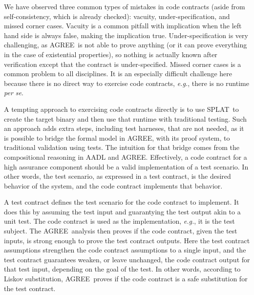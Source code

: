 \documentclass[global,twocolumn]{svjour}
\newcommand{\agr}{AGREE}
\newcommand{\splt}{SPLAT}
\newcommand{\eg}{\textit{e.g.}}
\begin{document}
We have observed three common types of mistakes in code contracts (aside from self-consistency, which is already checked): vacuity, under-specification, and missed corner cases.
%
Vacuity is a common pitfall with implication when the left hand side is always false, making the implication true.
%
Under-specification is very challenging, as \agr\ is not able to prove anything (or it can prove everything in the case of existential properties), so nothing is actually known after verification except that the contract is under-specified.
%
Missed corner cases is a common problem to all disciplines.
%
It is an especially difficult challenge here because there is no direct way to exercise code contracts, \eg, there is no runtime \emph{per se}.

A tempting approach to exercising code contracts directly is to use \splt\ to create the target binary and then use that runtime with traditional testing.
%
Such an approach adds extra steps, including test harneses, that are not needed, as it is possible to bridge the formal model in \agr, with its proof system, to traditional validation using tests.
%
The intuition for that bridge comes from the compositional reasoning in AADL and \agr.
%
Effectively, a code contract for a high assurance component should be a valid implementation of a test scenario.
%
In other words, the test scenario, as expressed in a test contract, is the desired behavior of the system, and the code contract implements that behavior.

A test contract defines the test scenario for the code contract to implement.
%
It does this by assuming the test input and guarantying the test output akin to a unit test.
%
The code contract is used as the implementation, \eg, it is the test subject.
%
The \agr\ analysis then proves if the code contract, given the test inputs, is strong enough to prove the test contract outputs.
%
Here the test contract assumptions strengthen the code contract assumptions to a single input, and the test contract guarantees weaken, or leave unchanged, the code contract output for that test input, depending on the goal of the test.
%
In other words, according to Liskov substitution, \agr\ proves if the code contract is a safe substitution for the test contract.
\end{document}
